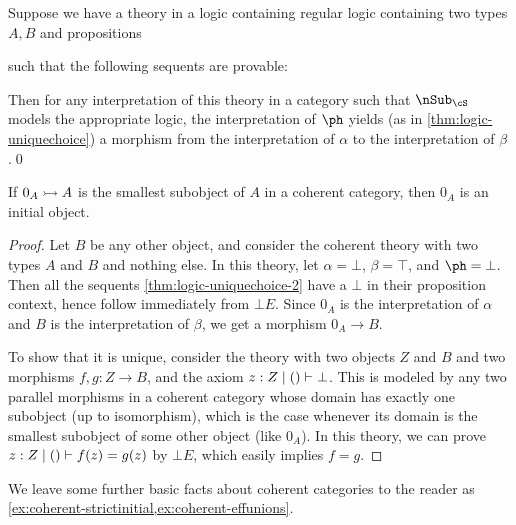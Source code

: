 \begin{lem}\label{thm:logic-uniquechoice-2}
  Suppose we have a theory in a logic containing regular logic containing two types $A,B$ and propositions
  such that the following sequents are provable:
  Then for any interpretation of this theory in a category \cS such that $\sub_\cS$ models the appropriate logic, the interpretation of $\ph$ yields (as in \cref{thm:logic-uniquechoice}) a morphism from the interpretation of $\alpha$ to the interpretation of $\beta$.\qed
\end{lem}

\begin{thm}
  If $0_A \rightarrowtail A$ is the smallest subobject of $A$ in a coherent category, then $0_A$ is an initial object.
\end{thm}
\begin{proof}
  Let $B$ be any other object, and consider the coherent theory with two types $A$ and $B$ and nothing else.
  In this theory, let $\alpha = \bot$, $\beta=\top$, and $\ph=\bot$.
  Then all the sequents \cref{thm:logic-uniquechoice-2} have a $\bot$ in their proposition context, hence follow immediately from $\bot E$.
  Since $0_A$ is the interpretation of $\alpha$ and $B$ is the interpretation of $\beta$, we get a morphism $0_A \to B$.

  To show that it is unique, consider the theory with two objects $Z$ and $B$ and two morphisms $f,g:Z\to B$, and the axiom $z:Z \mid () \vdash \bot$.
  This is modeled by any two parallel morphisms in a coherent category whose domain has exactly one subobject (up to isomorphism), which is the case whenever its domain is the smallest subobject of some other object (like $0_A$).
  In this theory, we can prove $z:Z \mid () \vdash f(z) = g(z)$ by $\bot E$, which easily implies $f=g$.
\end{proof}

We leave some further basic facts about coherent categories to the reader as \cref{ex:coherent-strictinitial,ex:coherent-effunions}.


